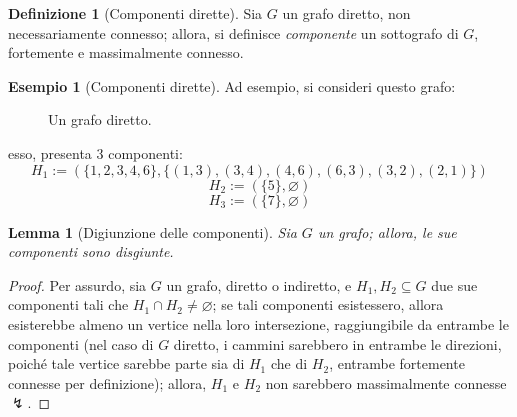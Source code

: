 \documentclass[14pt]{extreport}
\newtheorem{lemma}{Lemma}[subsection]
\theoremstyle{definition}
\newtheorem{definition}{Definizione}[subsection]
\theoremstyle{definition}
\newtheorem{example}{Esempio}[subsection]
\begin{document}
\begin{definition}[Componenti dirette]
    Sia $G$ un grafo diretto, non necessariamente connesso; allora, si definisce \textit{componente} un sottografo di $G$, fortemente e massimalmente connesso.
\end{definition}

\begin{example}[Componenti dirette]
    Ad esempio, si consideri questo grafo:

    \begin{figure}[H]
        \centering
        \caption{Un grafo diretto.}
    \end{figure}

    esso, presenta $3$ componenti: $$H_1 := (\{1, 2, 3, 4, 6\}, \{(1, 3), (3, 4), (4, 6), (6, 3), (3, 2), (2, 1)\})$$ $$H_2 := (\{5\}, \varnothing)$$ $$H_3 := (\{7\}, \varnothing)$$
\end{example}

\begin{lemma}[Digiunzione delle componenti]
    \label{disjoint comps}
    Sia $G$ un grafo; allora, le sue componenti sono disgiunte.
\end{lemma}

\begin{proof}
    Per assurdo, sia $G$ un grafo, diretto o indiretto, e $H_1, H_2 \subseteq G$ due sue componenti tali che $H_1 \cap H_2 \neq \varnothing$; se tali componenti esistessero, allora esisterebbe almeno un vertice nella loro intersezione, raggiungibile da entrambe le componenti (nel caso di $G$ diretto, i cammini sarebbero in entrambe le direzioni, poiché tale vertice sarebbe parte sia di $H_1$ che di $H_2$, entrambe fortemente connesse per definizione); allora, $H_1$ e $H_2$ non sarebbero massimalmente connesse $\lightning$.
\end{proof}
\end{document}
